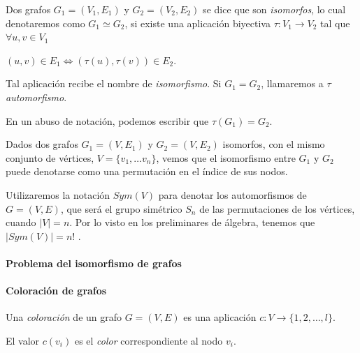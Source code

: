 \begin{definition}
	Dos grafos $G_1 = (V_1, E_1)$ y $G_2 = (V_2, E_2)$ se dice que son \textit{isomorfos}, lo cual denotaremos como $G_1 \simeq G_2$, si existe una aplicación biyectiva $\tau : V_1 \rightarrow V_2$ tal que $\forall u,v \in V_1$
	
	\begin{center}
		$(u,v) \in E_1 \Leftrightarrow (\tau(u), \tau(v)) \in E_2 $.
	\end{center}
	
	Tal aplicación recibe el nombre de \textit{isomorfismo}. Si $G_1 = G_2$, llamaremos a $\tau$ \textit{automorfismo}.
\end{definition}

En un abuso de notación, podemos escribir que $\tau(G_1) = G_2$.


\hfil

Dados dos grafos $G_1 = (V, E_1)$ y $G_2 = (V, E_2)$ isomorfos, con el mismo conjunto de vértices, $V=\{v_1,\dots v_n\}$, vemos que el isomorfismo entre $G_1$ y $G_2$ puede denotarse como una permutación en el índice de sus nodos.

Utilizaremos la notación $Sym(V)$ para denotar los automorfismos de $G=(V,E)$, que será el grupo simétrico $S_n$ de las permutaciones de los vértices, cuando $\mid V \mid=n$. Por lo visto en los preliminares de álgebra, tenemos que $\mid Sym(V) \mid = n!$ .

\hfil

\paragraph{Problema del isomorfismo de grafos}

\hfil





\hfil


\paragraph{Coloración de grafos}

\hfil

\begin{definition}
	Una \textit{coloración} de un grafo $G=(V,E)$ es una aplicación $c:V\rightarrow \{1,2,\dots , l\}$.

	El valor $c(v_i)$ es el \textit{color} correspondiente al nodo $v_i$.
\end{definition}


